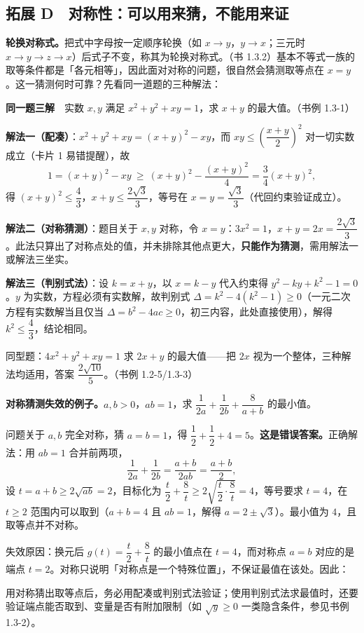 \newpage
\subsection*{拓展 D　对称性：可以用来猜，不能用来证}

\textbf{轮换对称式。}把式中字母按一定顺序轮换（如 $x\to y$，$y\to x$；三元时 $x\to y\to z\to x$）后式子不变，称其为轮换对称式。（书 1.3.2）基本不等式一族的取等条件都是「各元相等」，因此面对对称的问题，很自然会猜测取等点在 $x=y$。这一猜测何时可靠？先看同一道题的三种解法：

\textbf{同一题三解}　实数 $x,y$ 满足 $x^2+y^2+xy=1$，求 $x+y$ 的最大值。（书例 1.3-1）

\textbf{解法一（配凑）}：$x^2+y^2+xy=(x+y)^2-xy$，而 $xy\le\left(\dfrac{x+y}{2}\right)^2$ 对一切实数成立（卡片 1 易错提醒），故
\[
1=(x+y)^2-xy\ \ge\ (x+y)^2-\frac{(x+y)^2}{4}=\frac34(x+y)^2,
\]
得 $(x+y)^2\le\dfrac43$，$x+y\le\dfrac{2\sqrt3}{3}$，等号在 $x=y=\dfrac{\sqrt3}{3}$（代回约束验证成立）。

\textbf{解法二（对称猜测）}：题目关于 $x,y$ 对称，令 $x=y$：$3x^2=1$，$x+y=2x=\dfrac{2\sqrt3}{3}$。此法只算出了对称点处的值，并未排除其他点更大，\textbf{只能作为猜测}，需用解法一或解法三坐实。

\textbf{解法三（判别式法）}：设 $k=x+y$，以 $x=k-y$ 代入约束得 $y^2-ky+k^2-1=0$。$y$ 为实数，方程必须有实数解，故判别式 $\Delta=k^2-4(k^2-1)\ge 0$（一元二次方程有实数解当且仅当 $\Delta=b^2-4ac\ge 0$，初三内容，此处直接使用），解得 $k^2\le\dfrac43$，结论相同。

同型题：$4x^2+y^2+xy=1$ 求 $2x+y$ 的最大值——把 $2x$ 视为一个整体，三种解法均适用，答案 $\dfrac{2\sqrt{10}}{5}$。（书例 1.2-5/1.3-3）

\textbf{对称猜测失效的例子。}$a,b>0$，$ab=1$，求 $\dfrac{1}{2a}+\dfrac{1}{2b}+\dfrac{8}{a+b}$ 的最小值。

问题关于 $a,b$ 完全对称，猜 $a=b=1$，得 $\dfrac12+\dfrac12+4=5$。\textbf{这是错误答案。}正确解法：用 $ab=1$ 合并前两项，
\[
\frac{1}{2a}+\frac{1}{2b}=\frac{a+b}{2ab}=\frac{a+b}{2},
\]
设 $t=a+b\ge 2\sqrt{ab}=2$，目标化为 $\dfrac t2+\dfrac 8t\ge 2\sqrt{\dfrac t2\cdot\dfrac8t}=4$，等号要求 $t=4$，在 $t\ge 2$ 范围内可以取到（$a+b=4$ 且 $ab=1$，解得 $a=2\pm\sqrt3$）。最小值为 $4$，且取等点并不对称。

失效原因：换元后 $g(t)=\dfrac t2+\dfrac8t$ 的最小值点在 $t=4$，而对称点 $a=b$ 对应的是端点 $t=2$。对称只说明「对称点是一个特殊位置」，不保证最值在该处。因此：

\begin{strand}
用对称猜出取等点后，务必用配凑或判别式法验证；使用判别式法求最值时，还要验证端点能否取到、变量是否有附加限制（如 $\sqrt{y}\ge 0$ 一类隐含条件，参见书例 1.3-2）。
\end{strand}

\clearpage
